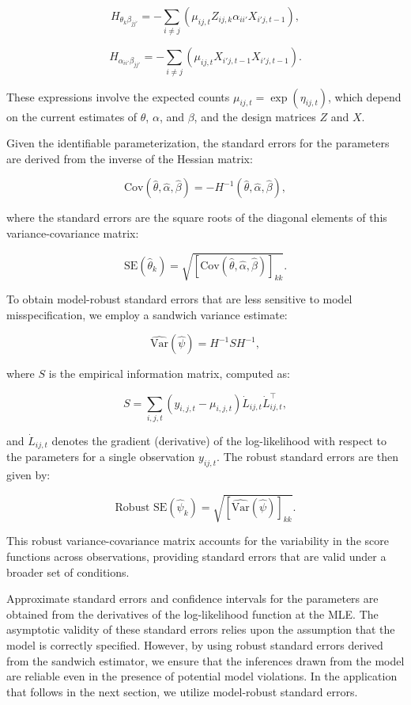 \[
H_{\theta_k \beta_{jj'}} = -\sum_{i \neq j} \left( \mu_{ij,t} Z_{ij,k} \alpha_{ii'} X_{i'j,t-1} \right),
\]

\[
H_{\alpha_{ii'} \beta_{jj'}} = -\sum_{i \neq j} \left( \mu_{ij,t} X_{i'j,t-1} X_{i'j,t-1} \right).
\]

These expressions involve the expected counts $\mu_{ij,t} = \exp(\eta_{ij,t})$, which depend on the current estimates of $\theta$, $\alpha$, and $\beta$, and the design matrices $Z$ and $X$.

Given the identifiable parameterization, the standard errors for the parameters are derived from the inverse of the Hessian matrix:

\[
\text{Cov}(\hat{\theta}, \hat{\alpha}, \hat{\beta}) = -H^{-1}(\hat{\theta}, \hat{\alpha}, \hat{\beta}),
\]

where the standard errors are the square roots of the diagonal elements of this variance-covariance matrix:

\[
\text{SE}(\hat{\theta}_k) = \sqrt{ \left[ \text{Cov}(\hat{\theta}, \hat{\alpha}, \hat{\beta}) \right]_{kk} }.
\]

To obtain model-robust standard errors that are less sensitive to model misspecification, we employ a sandwich variance estimate:

\[
\widehat{\text{Var}}(\hat{\psi}) = H^{-1} S H^{-1},
\]

where $ S $ is the empirical information matrix, computed as:

\[
S = \sum_{i,j,t} \left( y_{i,j,t} - \mu_{i,j,t} \right) \dot{L}_{ij,t} \dot{L}_{ij,t}^\top,
\]

and $ \dot{L}_{ij,t} $ denotes the gradient (derivative) of the log-likelihood with respect to the parameters for a single observation $ y_{ij,t} $. The robust standard errors are then given by:

\[
\text{Robust SE}(\hat{\psi}_k) = \sqrt{ \left[ \widehat{\text{Var}}(\hat{\psi}) \right]_{kk} }.
\]

This robust variance-covariance matrix accounts for the variability in the score functions across observations, providing standard errors that are valid under a broader set of conditions.

Approximate standard errors and confidence intervals for the parameters are obtained from the derivatives of the log-likelihood function at the MLE. The asymptotic validity of these standard errors relies upon the assumption that the model is correctly specified. However, by using robust standard errors derived from the sandwich estimator, we ensure that the inferences drawn from the model are reliable even in the presence of potential model violations. In the application that follows in the next section, we utilize model-robust standard errors.

